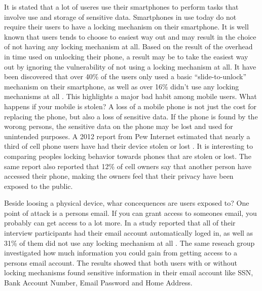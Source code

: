   It is stated that a lot of useres use their smartphones to perform tasks that involve use and storage of sensitive data. Smartphones in use today do not require their users to have a locking mechanism on their smartphone. It is well known that users tends to choose to easiest way out and may result in the choice of not having any locking mechanism at all. Based on the result of the overhead in time used on unlocking their phone, a result may be to take the easiest way out by ignoring the vulnerability of not using a locking mechanism at all. It have been discovered that over 40\% of the users only used a basic ``slide-to-unlock'' mechanism on their smartphone, as well as over 16\% didn't use any locking mechanisms at all \cite{habits3}. This highlights a major bad habit among mobile users. What happens if your mobile is stolen? A loss of a mobile phone is not just the cost for replacing the phone, but also a loss of sensitive data. If the phone is found by the worong persons, the sensitive data on the phone may be lost and used for unintended purposes. A 2012 report from Pew Internet estimated that nearly a third of cell phone users have had their device stolen or lost \cite{StolenLost}. It is interesting to comparing peoples locking behavior towards phones that are stolen or lost. The same report also reported that 12\% of cell owners say that another person have accessed their phone, making the owners feel that their privacy have been exposed to the public.

  Beside loosing a physical device, whar concequences are users exposed to? One point of attack is a persons email. If you can grant access to someones email, you probably can get access to a lot more. In a study reported that all of their interview participants had their email account automatically loged in, as well as 31\% of them did not use any locking mechanism at all \cite{Egelman}. The same reseach group investigated how much information you could gain from getting access to a persons email account. The results showed that both users with or without locking mechanisms found sensitive information in their email account like SSN, Bank Account Number, Email Password and Home Address.

